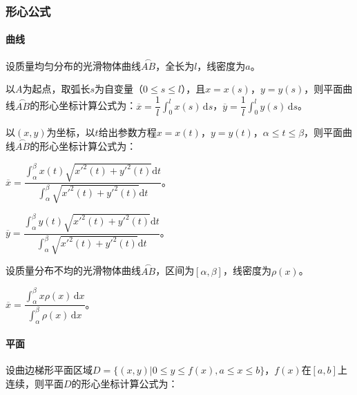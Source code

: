 \documentclass[UTF8, 12pt]{ctexart}
\begin{document}
        \subsubsection{形心公式}

        \paragraph{曲线} \leavevmode \medskip

        设质量均匀分布的光滑物体曲线$\overset{\frown}{AB}$，全长为$l$，线密度为$a$。

        以$A$为起点，取弧长$s$为自变量（$0\leqslant s\leqslant l$），且$x=x(s)$，$y=y(s)$，则平面曲线$\overset{\frown}{AB}$的形心坐标计算公式为：$\overline{x}=\dfrac{1}{l}\int_0^lx(s)\,\textrm{d}s$，$\overline{y}=\dfrac{1}{l}\int_0^ly(s)\,\textrm{d}s$。

        以$(x,y)$为坐标，以$t$给出参数方程$x=x(t)$，$y=y(t)$，$\alpha\leqslant t\leqslant\beta$，则平面曲线$\overset{\frown}{AB}$的形心坐标计算公式为：\medskip

        $\overline{x}=\dfrac{\int_\alpha^\beta x(t)\sqrt{x'^2(t)+y'^2(t)}\textrm{d}t}{\int_\alpha^\beta\sqrt{x'^2(t)+y'^2(t)}\textrm{d}t}$。

        $\overline{y}=\dfrac{\int_\alpha^\beta y(t)\sqrt{x'^2(t)+y'^2(t)}\textrm{d}t}{\int_\alpha^\beta\sqrt{x'^2(t)+y'^2(t)}\textrm{d}t}$。

        设质量分布不均的光滑物体曲线$\overset{\frown}{AB}$，区间为$[\alpha,\beta]$，线密度为$\rho(x)$。

        $\overline{x}=\dfrac{\int_\alpha^\beta x\rho(x)\,\textrm{d}x}{\int_\alpha^\beta\rho(x)\,\textrm{d}x}$。

        \paragraph{平面} \leavevmode \medskip

        设曲边梯形平面区域$D=\{(x,y)|0\leqslant y\leqslant f(x),a\leqslant x\leqslant b\}$，$f(x)$在$[a,b]$上连续，则平面$D$的形心坐标计算公式为：\medskip


\end{document}

